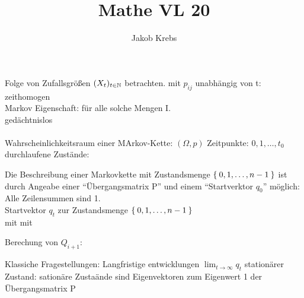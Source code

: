 \documentclass{../tudscript}
\author{Jakob Krebs}
\title{Mathe VL 20}
\begin{document}
Folge von Zufallsgrößen $(X_t)_{t \in \mathbb{N}}$ betrachten. mit
$p_{ij}$ unabhängig von t: zeithomogen\\

Markov Eigenschaft:
für alle solche Mengen I.\\
gedächtnislos\\\\

Wahrscheinlichkeitsraum einer MArkov-Kette: $(\Omega, p)$
Zeitpunkte: $0, 1, \ldots, t_0$\\
durchlaufene Zustände:



Die Beschreibung einer Markovkette mit Zustandsmenge $\Set{0, 1, \ldots, n-1}$ ist durch
Angeabe einer \enquote{Übergangsmatrix P} und einem \enquote{Startverktor $q_0$} möglich:
Alle Zeilensummen sind 1.\\
Startvektor $q_t$ zur Zustandsmenge $\Set{0, 1, \ldots, n-1}$\\
mit
mit

Berechung von $Q_{i +1}$:

Klassiche Fragestellungen:
Langfristige entwicklungen $\lim_{t \to \infty} q_t$
stationärer Zustand: sationäre Zustaände sind Eigenvektoren zum Eigenwert 1 der Übergangsmatrix P
\end{document}
